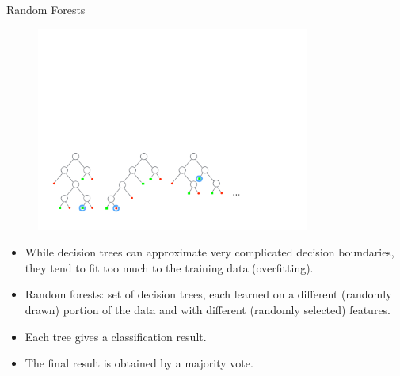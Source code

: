 \documentclass[xcolor=pdftex,dvipsnames,table]{beamer}
\begin{document}
\begin{frame}{Random Forests}
\begin{figure}[htb]
\includegraphics[width=0.8\textwidth]{../graphics/Forest.pdf}
\end{figure}
\begin{itemize}
	\item While decision trees can approximate very complicated decision boundaries, they tend to fit too much to the training data (overfitting).
	\item Random forests: set of decision trees, each learned on a different (randomly drawn) portion of the data and with different (randomly selected) features.
	\item Each tree gives a classification result.
	\item The final result is obtained by a majority vote.
\end{itemize}
\end{frame}
\end{document}
